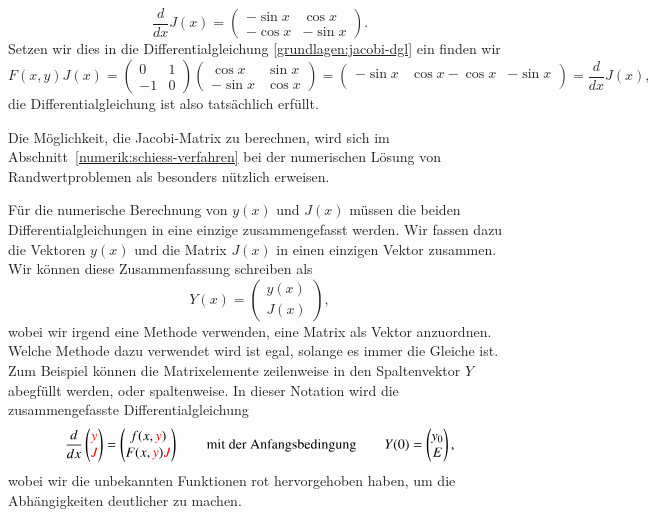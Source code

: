 \begin{beispiel}
\[
\frac{d}{dx}J(x)
=
\begin{pmatrix}
-\sin x& \cos x\\
-\cos x&-\sin x
\end{pmatrix}.
\]
Setzen wir dies in die Differentialgleichung \eqref{grundlagen:jacobi-dgl} ein
finden wir
\[
F(x,y)J(x)
=
\begin{pmatrix}
 0&1\\
-1&0
\end{pmatrix}
\begin{pmatrix}
 \cos x&\sin x\\
-\sin x&\cos x
\end{pmatrix}
=
\begin{pmatrix}
-\sin x& \cos x
-\cos x&-\sin x\\
\end{pmatrix}
=
\frac{d}{dx}J(x),
\]
die Differentialgleichung ist also tatsächlich erfüllt.
\end{beispiel}
Die Möglichkeit, die Jacobi-Matrix zu berechnen, wird sich im
Abschnitt~\ref{numerik:schiess-verfahren} bei der numerischen
Lösung von Randwertproblemen als besonders nützlich erweisen.

Für die numerische Berechnung von $y(x)$ und $J(x)$ müssen die
beiden Differentialgleichungen in eine einzige zusammengefasst werden.
Wir fassen dazu die Vektoren $y(x)$ und die Matrix $J(x)$ in einen
einzigen Vektor zusammen. 
Wir können diese Zusammenfassung schreiben als
\[
Y(x)=\begin{pmatrix}y(x)\\J(x)\end{pmatrix},
\]
wobei wir irgend eine Methode verwenden, eine Matrix als Vektor
anzuordnen.
Welche Methode dazu verwendet wird ist egal, solange es immer die 
Gleiche ist.
Zum Beispiel können die Matrixelemente zeilenweise in den Spaltenvektor
$Y$ abegfüllt werden, oder spaltenweise.
In dieser Notation wird die zusammengefasste Differentialgleichung
\begin{equation}
\frac{d}{dx}\begin{pmatrix}\color{red}y\\\color{red}J\end{pmatrix}
=
\begin{pmatrix}
f(x,{\color{red}y})\\
F(x,{\color{red}y}) {\color{red}J}
\end{pmatrix}
\qquad
\text{mit der Anfangsbedingung}
\qquad
Y(0)=
\begin{pmatrix}
y_0\\E
\end{pmatrix},
\end{equation}
wobei wir die unbekannten Funktionen rot hervorgehoben haben, um die
Abhängigkeiten deutlicher zu machen.

